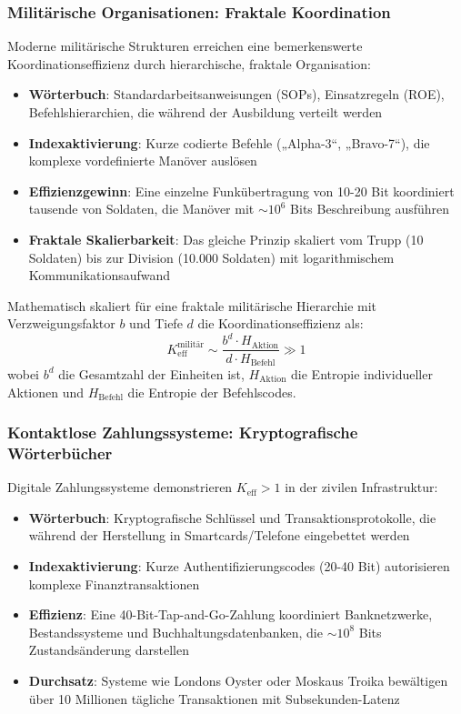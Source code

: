 \documentclass[11pt,a4paper]{article}
\begin{document}
	\subsubsection{Militärische Organisationen: Fraktale Koordination}
	Moderne militärische Strukturen erreichen eine bemerkenswerte Koordinationseffizienz durch hierarchische, fraktale Organisation:
	\begin{itemize}
		\item \textbf{Wörterbuch}: Standardarbeitsanweisungen (SOPs), Einsatzregeln (ROE), Befehlshierarchien, die während der Ausbildung verteilt werden
		\item \textbf{Indexaktivierung}: Kurze codierte Befehle („Alpha-3“, „Bravo-7“), die komplexe vordefinierte Manöver auslösen
		\item \textbf{Effizienzgewinn}: Eine einzelne Funkübertragung von 10-20 Bit koordiniert tausende von Soldaten, die Manöver mit $\sim 10^6$ Bits Beschreibung ausführen
		\item \textbf{Fraktale Skalierbarkeit}: Das gleiche Prinzip skaliert vom Trupp (10 Soldaten) bis zur Division (10.000 Soldaten) mit logarithmischem Kommunikationsaufwand
	\end{itemize}
	
	Mathematisch skaliert für eine fraktale militärische Hierarchie mit Verzweigungsfaktor $b$ und Tiefe $d$ die Koordinationseffizienz als:
	\begin{equation}
		K_{\mathrm{eff}}^{\text{militär}} \sim \frac{b^d \cdot H_{\text{Aktion}}}{d \cdot H_{\text{Befehl}}} \gg 1
	\end{equation}
	wobei $b^d$ die Gesamtzahl der Einheiten ist, $H_{\text{Aktion}}$ die Entropie individueller Aktionen und $H_{\text{Befehl}}$ die Entropie der Befehlscodes.
	
	\subsubsection{Kontaktlose Zahlungssysteme: Kryptografische Wörterbücher}
	Digitale Zahlungssysteme demonstrieren $K_{\mathrm{eff}} > 1$ in der zivilen Infrastruktur:
	\begin{itemize}
		\item \textbf{Wörterbuch}: Kryptografische Schlüssel und Transaktionsprotokolle, die während der Herstellung in Smartcards/Telefone eingebettet werden
		\item \textbf{Indexaktivierung}: Kurze Authentifizierungscodes (20-40 Bit) autorisieren komplexe Finanztransaktionen
		\item \textbf{Effizienz}: Eine 40-Bit-Tap-and-Go-Zahlung koordiniert Banknetzwerke, Bestandssysteme und Buchhaltungsdatenbanken, die $\sim 10^8$ Bits Zustandsänderung darstellen
		\item \textbf{Durchsatz}: Systeme wie Londons Oyster oder Moskaus Troika bewältigen über 10 Millionen tägliche Transaktionen mit Subsekunden-Latenz
	\end{itemize}
	
\end{document}
